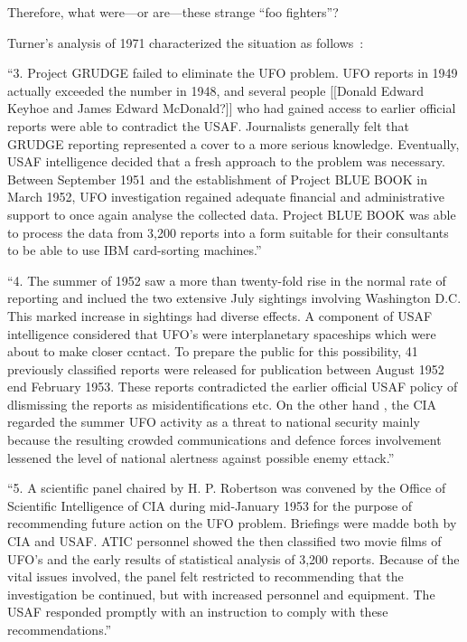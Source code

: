 Therefore, what were---or are---these strange ``foo fighters''?

Turner's analysis of 1971 characterized the situation as follows~\cite{TurnerAustralia1971}:
\begin{svgraybox}
``3. Project GRUDGE failed to eliminate the UFO problem. UFO
reports in 1949 actually exceeded the number in 1948, and several
people [[Donald Edward Keyhoe and James Edward McDonald?]]
who had gained access to earlier official reports were able
to contradict the USAF. Journalists generally felt that GRUDGE
reporting represented a cover to a more serious knowledge. Eventually,
USAF intelligence decided that a fresh approach to the problem was
necessary. Between September 1951 and the establishment of Project
BLUE BOOK in March 1952, UFO investigation regained adequate financial
and administrative support to once again analyse the collected data.
Project BLUE BOOK was able to process the data from 3,200 reports into
a form suitable for their consultants to be able to use
IBM card-sorting machines.''

``4. The summer of 1952 saw a more than twenty-fold rise in
the normal rate of reporting and inclued the two extensive July
sightings involving Washington D.C. This marked increase in sightings
had diverse effects. A component of USAF intelligence considered
that UFO's were interplanetary spaceships which were about to make
closer ccntact. To prepare the public for this possibility, 41
previously classified reports were released for publication between
August 1952 end February 1953. These reports contradicted the
earlier official USAF policy of dlismissing the reports as
misidentifications etc. On the other hand , the CIA regarded
the summer
UFO activity as a threat to national security mainly because the
resulting crowded communications and defence forces involvement
lessened the level of national alertness against possible enemy ettack.''

``5. A scientific panel chaired by H. P. Robertson was convened by
the Office of Scientific Intelligence of CIA during mid-January 1953
for the purpose of recommending future action on the UFO problem.
Briefings were madde both by CIA and USAF. ATIC personnel showed the
then classified two movie films of UFO's and the early results of
statistical analysis of 3,200 reports. Because of the vital issues
involved, the panel felt restricted to recommending that the
investigation be continued, but with increased personnel and equipment.
The USAF responded promptly with an instruction to comply with these
recommendations.''


\end{svgraybox}
